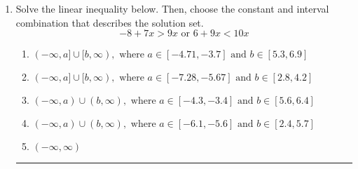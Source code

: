 \documentclass[14pt]{extbook}
\newcommand{\litem}[1]{\item#1\hspace*{-1cm}\rule{\textwidth}{0.4pt}}
\begin{document}
\begin{enumerate}
{\begin{enumerate}[label=\Alph*.]
\end{enumerate} }
\litem{
Solve the linear inequality below. Then, choose the constant and interval combination that describes the solution set.\[ -8 + 7 x > 9 x \text{ or } 6 + 9 x < 10 x \]\begin{enumerate}[label=\Alph*.]
\item \( (-\infty, a] \cup [b, \infty), \text{ where } a \in [-4.71, -3.7] \text{ and } b \in [5.3, 6.9] \)
\item \( (-\infty, a] \cup [b, \infty), \text{ where } a \in [-7.28, -5.67] \text{ and } b \in [2.8, 4.2] \)
\item \( (-\infty, a) \cup (b, \infty), \text{ where } a \in [-4.3, -3.4] \text{ and } b \in [5.6, 6.4] \)
\item \( (-\infty, a) \cup (b, \infty), \text{ where } a \in [-6.1, -5.6] \text{ and } b \in [2.4, 5.7] \)
\item \( (-\infty, \infty) \)

\end{enumerate} }
\end{enumerate}
\end{document}
